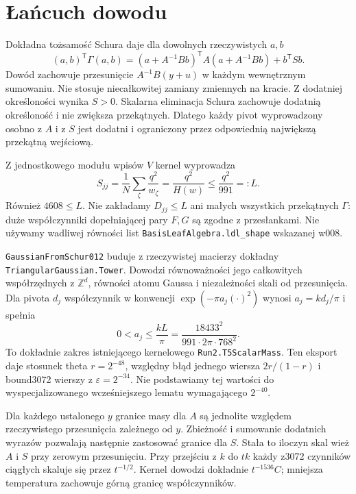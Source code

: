 \documentclass[11pt,a4paper]{article}
\newcommand{\code}[1]{\nolinkurl{#1}}
\begin{document}
\section{Łańcuch dowodu}
Dokładna tożsamość Schura daje dla dowolnych rzeczywistych $a,b$
\[
 (a,b)^{\mathsf T}\Gamma(a,b)=
 (a+A^{-1}Bb)^{\mathsf T}A(a+A^{-1}Bb)+b^{\mathsf T}Sb.
\]
Dowód zachowuje przesunięcie $A^{-1}B(y+u)$ w każdym wewnętrznym
sumowaniu. Nie stosuje niecałkowitej zamiany zmiennych na kracie.
Z dodatniej określoności wynika $S>0$. Skalarna eliminacja Schura
zachowuje dodatnią określoność i nie zwiększa przekątnych. Dlatego
każdy pivot wyprowadzony osobno z $A$ i z $S$ jest dodatni i ograniczony
przez odpowiednią największą przekątną wejściową.

Z jednostkowego modułu wpisów $V$ kernel wyprowadza
\[
 S_{jj}=\frac1N\sum_\zeta\frac{q^2}{w_\zeta}
       =\frac{q^2}{H(w)}\le\frac{q^2}{991}=:L.
\]
Również $4608\le L$. Nie zakładamy $D_{jj}\le L$ ani małych wszystkich
przekątnych $\Gamma$: duże współczynniki dopełniającej pary $F,G$ są
zgodne z przesłankami. Nie używamy wadliwej równości list
\code{BasisLeafAlgebra.ldl_shape} wskazanej w008.

\code{GaussianFromSchur012} buduje z rzeczywistej macierzy dokładny
\code{TriangularGaussian.Tower}. Dowodzi równoważności jego całkowitych
współrzędnych z $\mathbb Z^d$, równości atomu Gaussa i niezależności
skali od przesunięcia. Dla pivota $d_j$ współczynnik w konwencji
$\exp(-\pi a_j(\cdot)^2)$ wynosi $a_j=kd_j/\pi$ i spełnia
\[
 0<a_j\le\frac{kL}{\pi}=
 \frac{18433^2}{991\cdot2\pi\cdot768^2}.
\]
To dokładnie zakres istniejącego kernelowego \code{Run2.T5ScalarMass}.
Ten eksport daje stosunek theta $r=2^{-48}$, względny błąd jednego
wiersza $2r/(1-r)$ i bound3072 wierszy z $\varepsilon=2^{-34}$.
Nie podstawiamy tej wartości do wyspecjalizowanego wcześniejszego
lematu wymagającego $2^{-40}$.

Dla każdego ustalonego $y$ granice masy dla $A$ są jednolite względem
rzeczywistego przesunięcia zależnego od $y$. Zbieżność i sumowanie
dodatnich wyrazów pozwalają następnie zastosować granice dla $S$.
Stała to iloczyn skal wież $A$ i $S$ przy zerowym przesunięciu.
Przy przejściu z $k$ do $tk$ każdy z3072 czynników ciągłych skaluje się
przez $t^{-1/2}$. Kernel dowodzi dokładnie $t^{-1536}C$; mniejsza
temperatura zachowuje górną granicę współczynników.
\end{document}
